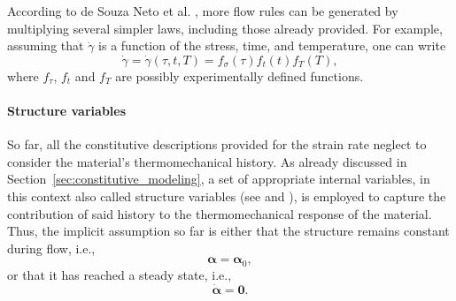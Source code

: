 According to de Souza Neto et al. \citep{desouzanetoComputationalMethodsPlasticity2008}, more flow rules can be generated by multiplying several simpler laws, including those already provided.
For example, assuming that $\dot \gamma$ is a function of the stress, time, and temperature, one can write
\begin{equation}
	\dot \gamma = \dot \gamma(\tau, t, T) = f_\sigma (\tau) f_t(t) f_T(T),
\end{equation}
where $f_\tau$, $f_t$ and $f_T$ are possibly experimentally defined functions.


\paragraph{Structure variables}
So far, all the constitutive descriptions provided for the strain rate neglect to consider the material's thermomechanical history.
As already discussed in Section~\ref{sec:constitutive_modeling}, a set of appropriate internal variables, in this context also called structure variables (see \cite{kocks1975thermodynamics} and \cite{frostDeformationmechanismMapsPlasticity1982}), is employed to capture the contribution of said history to the thermomechanical response of the material.
Thus, the implicit assumption so far is either that the structure remains constant during flow, i.e.,
\begin{equation}
  \bm \alpha = \bm \alpha_0,
\end{equation}
or that it has reached a steady state, i.e.,
\begin{equation}
  \dot{\bm \alpha} = \bm 0.
\end{equation}

